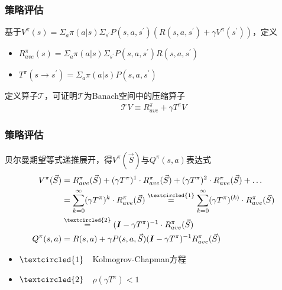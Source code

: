 \documentclass{beamer}
\begin{document}
\begin{CJK*}{GBK}{hei}
\begin{frame}\frametitle{策略评估}
\begin{theorem}
基于$V^{\pi}(s)=\Sigma_{a} \pi(a \vert s) \Sigma_{s^{\prime}} P\left(s, a, s^{\prime}\right)\left(R\left(s, a, s^{\prime}\right)+\gamma V^{\pi}\left(s^{\prime}\right)\right)$，定义
\begin{itemize}
\item $R^{\pi}_{ave}(s)=\Sigma_{a} \pi(a | s) \Sigma_{s^{\prime}} P\left(s, a, s^{\prime}\right)R\left(s, a, s^{\prime}\right)$
\item $T^{\pi}(s\rightarrow s^{\prime})=\Sigma_{a} \pi(a | s) P\left(s, a, s^{\prime}\right)$
\end{itemize}
定义算子$\mathcal{T}$，可证明$\mathcal{T}$为Banach空间中的压缩算子
    \begin{align*}
        \mathcal{T} V\equiv R^{\pi}_{ave}+\gamma T^{\pi} V
    \end{align*}
\end{theorem}
\end{frame}

\begin{frame}\frametitle{策略评估}
\begin{theorem}
贝尔曼期望等式递推展开，得$V^{\pi}(\vec S)$与$Q^{\pi}(s, a)$表达式
        \begin{align*}
          V^{\pi}(\vec S) &= R^{\pi}_{ave}(\vec S) + (\gamma T^{\pi})^{1} \cdot R^{\pi}_{ave}(\vec S) + (\gamma T^{\pi})^{2} \cdot R^{\pi}_{ave}(\vec S) + \dots\\
              &= \sum_{k=0}^{\infty} (\gamma T^{\pi})^{k}\cdot R^{\pi}_{ave}(\vec S)\overset{\textcircled{\small{1}}}{=} \sum_{k=0}^{\infty} (\gamma T^{\pi})^{(k)}\cdot R^{\pi}_{ave}(\vec S)\\
              &\overset{\textcircled{\small{2}}}{=} (\boldsymbol{I}-\gamma T^{\pi})^{-1}\cdot R^{\pi}_{ave}(\vec S)\\
          Q^{\pi}(s, a)&=R(s,a)+\gamma P(s,a,\vec S)(\boldsymbol{I}-\gamma T^{\pi})^{-1}R_{ave}^{\pi}(\vec S)
        \end{align*}
        \begin{itemize}
        \item $\textcircled{\small{1}}$~~Kolmogrov-Chapman方程
        \item $\textcircled{\small{2}}$~~$\rho(\gamma T^{\pi})<1$
        \end{itemize}
\end{theorem}
\end{frame}


\end{CJK*}
\end{document}
